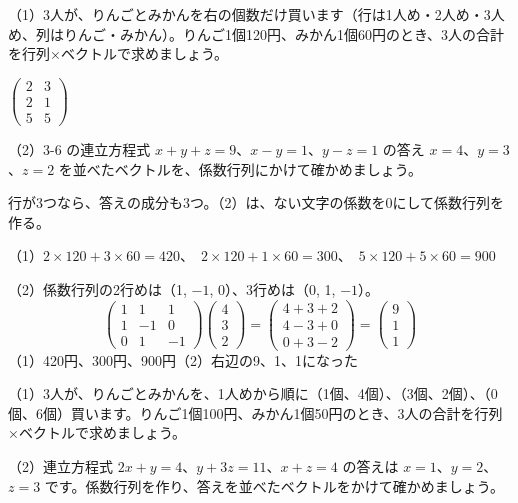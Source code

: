 \begin{reidai}
\noindent\begin{minipage}[c]{0.66\linewidth}\raggedright
（1）3人が、りんごとみかんを右の個数だけ買います（行は1人め・2人め・3人め、列はりんご・みかん）。りんご1個120円、みかん1個60円のとき、3人の合計を行列×ベクトルで求めましょう。
\end{minipage}\hfill
\begin{minipage}[c]{0.3\linewidth}\centering
$\begin{pmatrix} 2 & 3\\ 2 & 1\\ 5 & 5 \end{pmatrix}$
\end{minipage}\par\vspace{2pt}
（2）3-6 の連立方程式 $x+y+z=9$、$x-y=1$、$y-z=1$ の答え $x=4$、$y=3$、$z=2$ を並べたベクトルを、係数行列にかけて確かめましょう。\par
\kangaekata 行が3つなら、答えの成分も3つ。（2）は、ない文字の係数を0にして係数行列を作る。\par
\shiki\kviibs{}\zw{} （1）$2\times120+3\times60=420$、\ $2\times120+1\times60=300$、\ $5\times120+5\times60=900$\par
\kviiba （2）係数行列の2行めは（1, $-1$, 0）、3行めは（0, 1, $-1$）。
\[ \begin{pmatrix} 1 & 1 & 1\\ 1 & -1 & 0\\ 0 & 1 & -1 \end{pmatrix}\begin{pmatrix} 4\\ 3\\ 2 \end{pmatrix}=\begin{pmatrix} 4+3+2\\ 4-3+0\\ 0+3-2 \end{pmatrix}=\begin{pmatrix} 9\\ 1\\ 1 \end{pmatrix} \]
\kotae\kviibs{}\zw{} （1）420円、300円、900円\quad （2）右辺の9、1、1になった
\end{reidai}

\begin{jibun}
（1）3人が、りんごとみかんを、1人めから順に（1個、4個）、（3個、2個）、（0個、6個）買います。りんご1個100円、みかん1個50円のとき、3人の合計を行列×ベクトルで求めましょう。\par
（2）連立方程式 $2x+y=4$、$y+3z=11$、$x+z=4$ の答えは $x=1$、$y=2$、$z=3$ です。係数行列を作り、答えを並べたベクトルをかけて確かめましょう。
\end{jibun}

